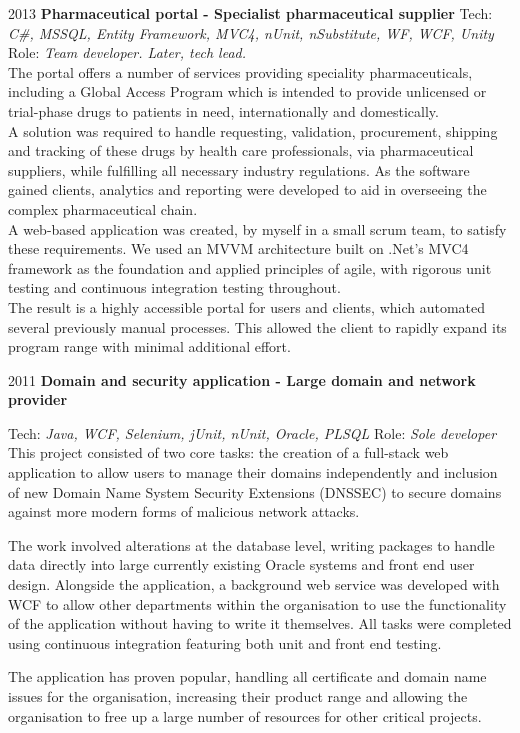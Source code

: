 \documentclass[]{friggeri-cv} %
\begin{document}
\begin{entrylist}
\entry
{2013}
{\textbf{Pharmaceutical portal - Specialist pharmaceutical supplier}}
{}
{Tech:  \emph{C\#, MSSQL, Entity Framework, MVC4, nUnit, nSubstitute, WF, WCF, Unity} \\ Role: \emph{Team developer. Later, tech lead.}\\
The portal offers a number of services providing speciality pharmaceuticals, including
a Global Access Program which is intended to provide unlicensed or trial-phase drugs
to patients in need, internationally and domestically.\\
A solution was required to handle
requesting, validation, procurement, shipping and tracking of these drugs by health care
professionals, via pharmaceutical suppliers, while fulfilling all necessary industry regulations. As the software gained clients, analytics and reporting were developed
to aid in overseeing the complex pharmaceutical chain. \\
A web-based application was created, by myself in a small scrum team, to satisfy these
requirements. We used an MVVM architecture built on .Net’s MVC4 framework as the foundation and applied principles of agile, with rigorous unit testing and continuous integration testing throughout. \\
The result is a highly accessible portal for users and clients, which automated several previously manual processes. This allowed the client to rapidly expand
its program range with minimal additional effort. 
}

\entry
{2011}
{\textbf{Domain and security application - Large domain and network provider}}
{}
{Tech: \emph{Java, WCF, Selenium, jUnit, nUnit, Oracle, PLSQL} \hfill Role: \emph{Sole developer} \\
This project consisted of two core tasks: the creation of a full-stack web application to allow users to manage their domains independently and inclusion of new Domain Name System Security Extensions (DNSSEC) to secure domains against more modern forms of malicious network attacks.

The work involved alterations at the database level, writing packages to handle data directly into large currently existing Oracle systems  and front end user design. Alongside the application, a background web service was developed with WCF to allow other departments within the organisation to use the functionality of the application without having to write it themselves. All tasks were completed using continuous integration featuring both unit and front end testing.

The application has proven popular, handling all certificate and domain name issues for the organisation, increasing their product range and allowing the organisation to free up a large number of resources for other critical projects.
}

\end{entrylist}
\end{document}
